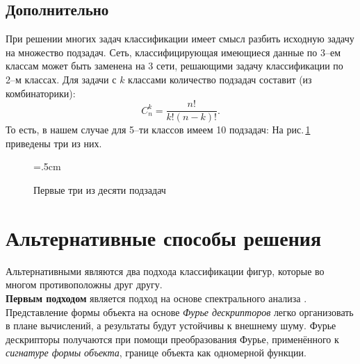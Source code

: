 \documentclass[12pt,a4paper]{article}
\begin{document}
\subsection*{Дополнительно}
При решении многих задач классификации имеет смысл разбить исходную задачу на множество подзадач. Сеть, классифицирующая
имеющиеся данные по 3--ем классам может быть заменена на 3 сети, решающими задачу классификации по 2--м классах. Для задачи с $k$ классами количество подзадач составит
(из комбинаторики): 
$$C_{n}^{k} = \frac{n!}{k!(n-k)!}.$$ 
То есть, в нашем случае для 5--ти классов имеем 10 подзадач:
На рис.\,\ref{fig:06} приведены три из них.
\begin{figure}[tbh!]
	\center
	\newdimen\R
	\R=.5cm
	\caption{Первые три из десяти подзадач}
	\label{fig:06}
\end{figure}


\section{Альтернативные способы решения}
Альтернативными являются два подхода классификации фигур, которые во многом противоположны друг другу.\\
\noindent
\textbf{Первым подходом} является подход на основе спектрального анализа \cite{direkoglu2011}. 
Представление формы объекта на основе \emph{Фурье дескрипторов} легко организовать в плане вычислений,
а результаты будут устойчивы к внешнему шуму. Фурье дескрипторы получаются при помощи преобразования
Фурье, применённого к \emph{сигнатуре формы объекта}, границе объекта как одномерной функции.
\end{document}
